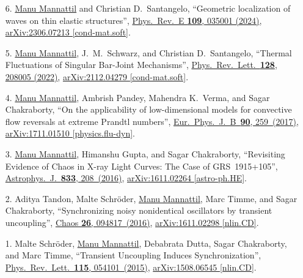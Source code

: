 \documentclass[10pt,a4paper,article,oneside]{memoir}
\def\bname{\underline{Manu Mannattil}}    %
\def\doi#1#2{\href{https://doi.org/#1}{#2}}
\def\arxiv#1#2{\href{https://arxiv.org/abs/#1}{arXiv:#1 [#2]}}
\begin{document}



\begin{enumerate}
  \item[6.] {\bname} and Christian D.~Santangelo, ``Geometric localization of waves on thin elastic structures'', \doi{10.1103/PhysRevE.109.035001}{Phys.~Rev.~E \textbf{109}, 035001 (2024)}, \arxiv{2306.07213}{cond-mat.soft}.
  \item[5.] \bname, J.~M.~Schwarz, and Christian D.~Santangelo, ``Thermal Fluctuations of Singular Bar-Joint Mechanisms'', \doi{10.1103/PhysRevLett.128.208005}{Phys.~Rev.~Lett.~\textbf{128}, 208005 (2022)}, \arxiv{2112.04279}{cond-mat.soft}.
  \item[4.] \bname, Ambrish Pandey, Mahendra K.~Verma, and Sagar Chakraborty, ``On the applicability of low-dimensional models for convective flow reversals at extreme Prandtl numbers'', \doi{10.1140/epjb/e2017-80391-1}{Eur.~Phys.~J.~B~\textbf{90}, 259~(2017)}, \arxiv{1711.01510}{physics.flu-dyn}.
  \item[3.] \bname, Himanshu Gupta, and Sagar Chakraborty, ``Revisiting Evidence of Chaos in X-ray Light Curves: The Case of GRS~1915+105'', \doi{10.3847/1538-4357/833/2/208}{Astrophys.~J.~\textbf{833}, 208~(2016)}, \arxiv{1611.02264}{astro-ph.HE}.
  \item[2.] Aditya Tandon, Malte Schr\"{o}der, \bname, Marc Timme, and Sagar Chakraborty, ``Synchronizing noisy nonidentical oscillators by transient uncoupling'', \doi{10.1063/1.4959141}{Chaos \textbf{26}, 094817~(2016)}, \arxiv{1611.02298}{nlin.CD}.
  \item[1.] Malte Schr\"{o}der, \bname, Debabrata Dutta, Sagar Chakraborty, and Marc Timme, ``Transient Uncoupling Induces Synchronization'', \doi{10.1103/PhysRevLett.115.054101}{Phys.~Rev.~Lett.~\textbf{115}, 054101~(2015)}, \arxiv{1508.06545}{nlin.CD}.
\end{enumerate}
\end{document}
